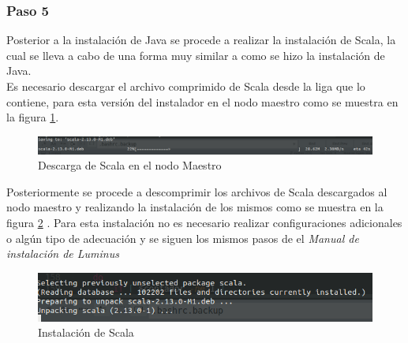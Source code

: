 \subsubsection{Paso 5}
Posterior a la instalación de Java se procede a realizar la instalación de Scala, la cual se lleva a cabo de una forma muy similar a como se hizo la instalación de Java.
\\ 
Es necesario descargar el archivo comprimido de Scala desde la liga que lo contiene, para esta versión del instalador en el nodo maestro como se muestra en la figura \ref{fig:descarga}. 
\begin{figure}[H]
	\hypertarget{fig:descarga}{\hspace{1pt}}
	\begin{center}	
		\includegraphics[width=.9\textwidth]{capitulo5/images/descargascala.png}
		\caption{Descarga de Scala en el nodo Maestro}
		\label{fig:descarga}
	\end{center}
\end{figure}
Posteriormente se procede a descomprimir los archivos de Scala descargados al nodo maestro y realizando la instalación de los mismos como se muestra en la figura \ref{fig:scala} .
Para esta instalación no es necesario realizar configuraciones adicionales o algún tipo de adecuación y se siguen los mismos pasos de el \emph{Manual de instalación de Luminus}
\begin{figure}[H]
	\hypertarget{fig:scala}{\hspace{1pt}}
	\begin{center}	
		\includegraphics[width=.5\textwidth]{capitulo5/images/instalacionscalam.png}
		\caption{Instalación de Scala}
		\label{fig:scala}
	\end{center}
\end{figure}
